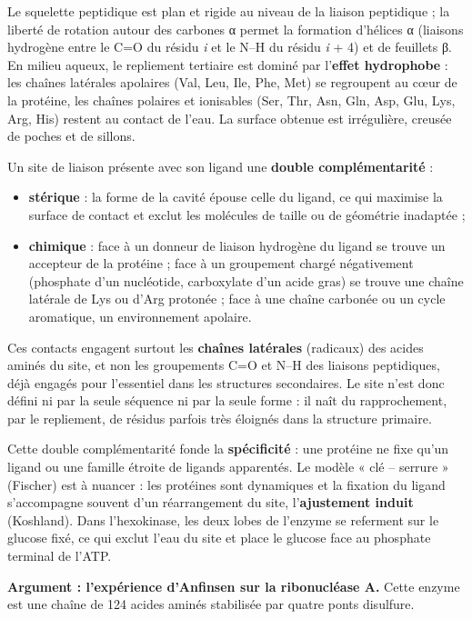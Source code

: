 \documentclass[11pt,a4paper]{article}
\providecommand{\tightlist}{\setlength{\itemsep}{0pt}\setlength{\parskip}{0pt}}
\begin{document}
Le squelette peptidique est plan et rigide au niveau de la liaison peptidique ; la liberté de rotation autour des carbones α permet la formation d'hélices α (liaisons hydrogène entre le C=O du résidu \emph{i} et le N--H du résidu \emph{i} + 4) et de feuillets β. En milieu aqueux, le repliement tertiaire est dominé par l'\textbf{effet hydrophobe} : les chaînes latérales apolaires (Val, Leu, Ile, Phe, Met) se regroupent au cœur de la protéine, les chaînes polaires et ionisables (Ser, Thr, Asn, Gln, Asp, Glu, Lys, Arg, His) restent au contact de l'eau. La surface obtenue est irrégulière, creusée de poches et de sillons.

Un site de liaison présente avec son ligand une \textbf{double complémentarité} :

\begin{itemize}
\tightlist
\item
  \textbf{stérique} : la forme de la cavité épouse celle du ligand, ce qui maximise la surface de contact et exclut les molécules de taille ou de géométrie inadaptée ;
\item
  \textbf{chimique} : face à un donneur de liaison hydrogène du ligand se trouve un accepteur de la protéine ; face à un groupement chargé négativement (phosphate d'un nucléotide, carboxylate d'un acide gras) se trouve une chaîne latérale de Lys ou d'Arg protonée ; face à une chaîne carbonée ou un cycle aromatique, un environnement apolaire.
\end{itemize}

Ces contacts engagent surtout les \textbf{chaînes latérales} (radicaux) des acides aminés du site, et non les groupements C=O et N--H des liaisons peptidiques, déjà engagés pour l'essentiel dans les structures secondaires. Le site n'est donc défini ni par la seule séquence ni par la seule forme : il naît du rapprochement, par le repliement, de résidus parfois très éloignés dans la structure primaire.

Cette double complémentarité fonde la \textbf{spécificité} : une protéine ne fixe qu'un ligand ou une famille étroite de ligands apparentés. Le modèle « clé -- serrure » (Fischer) est à nuancer : les protéines sont dynamiques et la fixation du ligand s'accompagne souvent d'un réarrangement du site, l'\textbf{ajustement induit} (Koshland). Dans l'hexokinase, les deux lobes de l'enzyme se referment sur le glucose fixé, ce qui exclut l'eau du site et place le glucose face au phosphate terminal de l'ATP.

\textbf{Argument : l'expérience d'Anfinsen sur la ribonucléase A.} Cette enzyme est une chaîne de 124 acides aminés stabilisée par quatre ponts disulfure.
\end{document}
